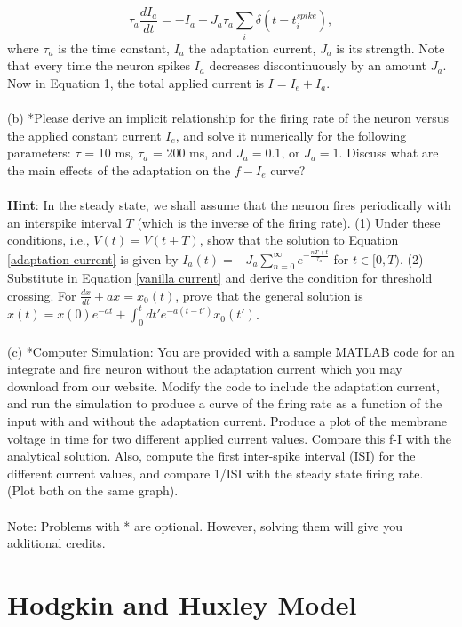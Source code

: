 \documentclass{article}
\begin{document}
\begin{equation}
\label{adaptation current}
\tau_a \frac{dI_a}{dt}=-I_a - J_a\tau_a\sum_i\delta(t-t^{spike}_{i}), 
\end{equation}
where $\tau_a$ is the time constant, $I_a$ the adaptation current, $J_a$ is its strength. Note that every time the neuron spikes $I_a$ decreases discontinuously by an amount $J_a$. Now in Equation 1,  the total applied current is $I=I_e+I_a$.
\\
\\
(b) *Please derive an implicit relationship for the firing rate of the neuron versus the applied constant current $I_e$, and solve it numerically for the following parameters: $\tau$ = 10 ms, $\tau_a$ = 200 ms, and $J_a =0.1$, or $J_a = 1$. Discuss what are the main effects of the adaptation on the $f-I_e$ curve?
\\
\\
\textbf{Hint}: In the steady state, we shall assume that the neuron fires periodically with an interspike interval $T$ (which is the inverse of the firing rate). (1) Under these conditions, i.e., $V(t)=V(t+T)$, show that the solution to Equation \ref{adaptation current} is given by $I_a(t)=-J_a\sum_{n=0}^{\infty} e^{-\frac{nT+t}{\tau_a}}$ for $t \in [0, T)$. (2) Substitute in Equation \ref{vanilla current} and derive the condition for threshold crossing. For $\frac{dx}{dt}+ax=x_0(t)$, prove that the general solution is $x(t)=x(0)e^{-at}+\int_{0}^{t}dt'e^{-a(t-t')}x_0(t')$. 
\\
\\
(c) *Computer Simulation: You are provided with a sample MATLAB code for an integrate and fire neuron without the adaptation current which you may download from our website. Modify the code to include the adaptation current, and run the simulation to produce a curve of the firing rate as a function of the input with and without the adaptation current. Produce a plot of the membrane voltage in time for two different applied current values. Compare this f-I with the analytical solution. Also, compute the first inter-spike interval (ISI) for the different current values, and compare 1/ISI with the steady state firing rate. (Plot both on the same graph).
\\
\\
Note: Problems with * are optional. However, solving them will give you additional credits.


\section*{Hodgkin and Huxley Model}
\end{document}
